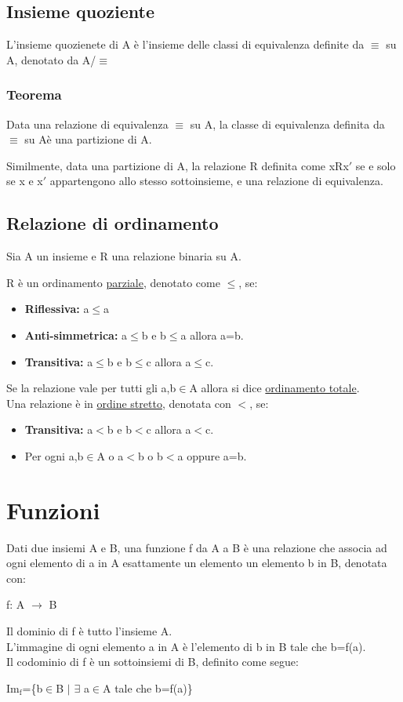 \documentclass[../main.tex]{subfiles}
\begin{document}
    \subsection{Insieme quoziente}
    L'insieme quozienete di A è l'insieme delle classi di equivalenza definite da $\equiv$ su A, denotato da A/$\equiv$

    \subsubsection{Teorema}
    Data una relazione di equivalenza $\equiv$ su A, la classe di equivalenza definita da $\equiv$ su Aè una partizione di A.


    Similmente, data una partizione di A, la relazione R definita come xRx$\prime$ se e solo se x e x$\prime$ appartengono allo stesso sottoinsieme, e una relazione di equivalenza.

    \subsection{Relazione di ordinamento}
    Sia A un insieme e R una relazione binaria su A.


    R è un ordinamento \underline{parziale}, denotato come $\leq$, se:
    \begin{itemize}
        \item \textbf{Riflessiva:} a$\leq$a
        \item \textbf{Anti-simmetrica:} a$\leq$b e b$\leq$a allora a=b.
        \item \textbf{Transitiva:} a$\leq$b e b$\leq$c allora a$\leq$c.
    \end{itemize}
    Se la relazione vale per tutti gli a,b$\in$A allora si dice \underline{ordinamento totale}.\\
    Una relazione è in \underline{ordine stretto}, denotata con $<$, se:
    \begin{itemize}
        \item \textbf{Transitiva:} a$<$b e b$<$c allora a$<$c.
        \item Per ogni a,b$\in$A o a$<$b o b$<$a oppure a=b.
    \end{itemize}

    \section{Funzioni}
    Dati due insiemi A e B, una funzione f da A a B è una relazione che associa ad ogni elemento di a in A esattamente un elemento un elemento b in B, denotata con:
    \begin{center}
        f: A $\to$ B
    \end{center}
    Il dominio di f è tutto l'insieme A.\\
    L'immagine di ogni elemento a in A è l'elemento di b in B tale che b=f(a).\\
    Il codominio di f è un sottoinsiemi di B, definito come segue:
    \begin{center}
        $\text{Im}_\text{f}$=\{b$\in$B $|$ $\exists$ a$\in$A tale che b=f(a)\}
    \end{center}
\end{document}
